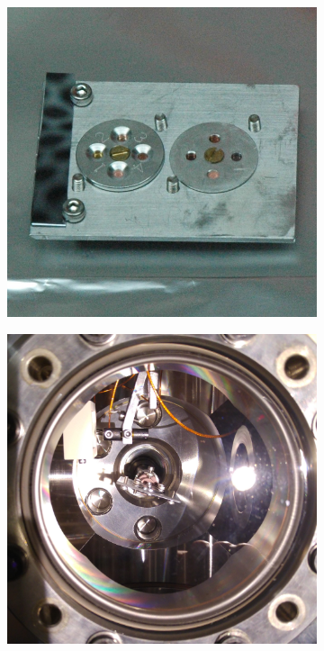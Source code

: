 \begin{figure}
    \centering
    \begin{subfigure}{0.49\linewidth}
    \centering
    \includegraphics[width=\linewidth]{part2/Figs/sample_holder_alone.jpg}
    \end{subfigure}
    \begin{subfigure}{0.49\linewidth}
    \centering
    \includegraphics[width=\linewidth]{part2/Figs/sample_holder_in_vitro.jpg}

\end{subfigure}
\end{figure}
